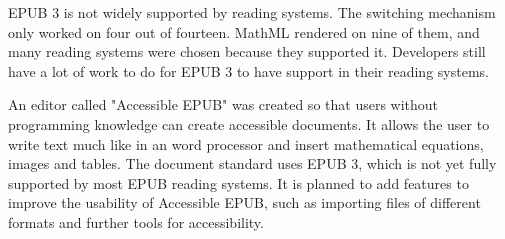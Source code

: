 EPUB 3 is not widely supported by reading systems. The switching mechanism only worked on four out of fourteen. MathML rendered on nine of them, and many reading systems were chosen because they supported it. Developers still have a lot of work to do for EPUB 3 to have support in their reading systems.

An editor called "Accessible EPUB" was created so that users without programming knowledge can create accessible documents. It allows the user to write text much like in an word processor and insert mathematical equations, images and tables. The document standard uses EPUB 3, which is not yet fully supported by most EPUB reading systems. It is planned to add features to improve the usability of Accessible EPUB, such as importing files of different formats and further tools for accessibility.
